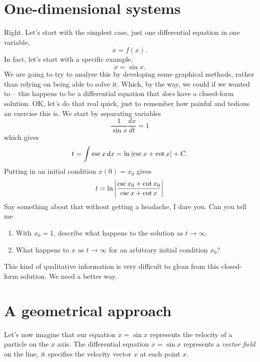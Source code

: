 \section{One-dimensional systems}
Right. Let's start with the simplest case, just one differential equation
in one variable,
\begin{equation*}
    \dot{x} = f(x).
\end{equation*}
In fact, let's start with a specific example,
\begin{equation*}
    \dot{x} = \sin x.
\end{equation*}
We are going to try to analyse this by developing some graphical methods,
rather than relying on being able to solve it. Which, by the way, we could
if we wanted to -- this happens to be a differential equation that
\emph{does} have a closed-form solution. OK, let's do that real quick, just
to remember how painful and tedious an exercise this is. We start by
separating variables
\begin{equation*}
    \frac{1}{\sin x}\frac{dx}{dt} = 1
\end{equation*}
which gives
\begin{equation*}
    t = \int \csc x \, dx = \ln \left\lvert\csc x + \cot x\right\rvert + C.
\end{equation*}
Putting in an initial condition $x(0) = x_0$ gives
\begin{equation*}
    t = \ln \left\lvert\frac{\csc{x_0} + \cot x_0}{\csc x + \cot x}\right\rvert
\end{equation*}
Say something about that without getting a headache, I dare you. Can you
tell me
\begin{enumerate}
    \item With $x_0 = 1$, describe what happens to the solution as $t \to
        \infty$.
    \item What happens to $x$ as $t \to \infty$ for an arbitrary initial
        condition $x_0$?
\end{enumerate}
This kind of qualitative information is very difficult to glean from this
closed-form solution. We need a better way.

\section{A geometrical approach}
Let's now imagine that our equation $\dot{x} = \sin x$ represents the
velocity of a particle on the $x$ axis. The differential equation $\dot x =
\sin x $ represents a \emph{vector field} on the line, it specifies the
velocity vector $\dot x$ at each point $x$. 

